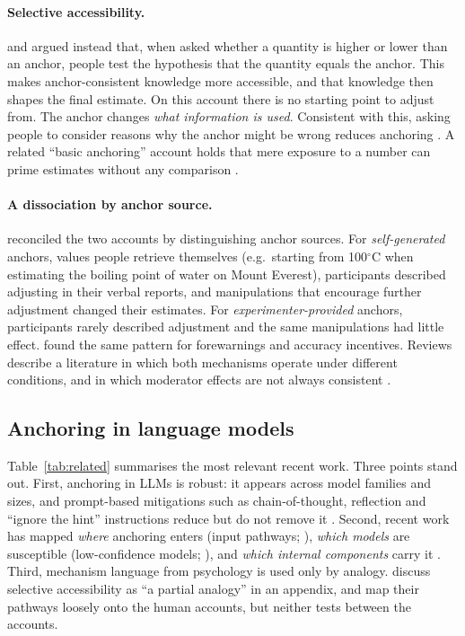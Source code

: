\documentclass[11pt,a4paper]{article}
\begin{document}
\paragraph{Selective accessibility.} \citet{strack1997explaining} and \citet{mussweiler1999hypothesis} argued instead that, when asked whether a quantity is higher or lower than an anchor, people test the hypothesis that the quantity equals the anchor. This makes anchor-consistent knowledge more accessible, and that knowledge then shapes the final estimate. On this account there is no starting point to adjust from. The anchor changes \emph{what information is used}. Consistent with this, asking people to consider reasons why the anchor might be wrong reduces anchoring \citep{mussweiler2000overcoming}. A related ``basic anchoring'' account holds that mere exposure to a number can prime estimates without any comparison \citep{wilson1996new}.

\paragraph{A dissociation by anchor source.} \citet{epley2001putting} reconciled the two accounts by distinguishing anchor sources. For \emph{self-generated} anchors, values people retrieve themselves (e.g.\ starting from 100$^\circ$C when estimating the boiling point of water on Mount Everest), participants described adjusting in their verbal reports, and manipulations that encourage further adjustment changed their estimates. For \emph{experimenter-provided} anchors, participants rarely described adjustment and the same manipulations had little effect. \citet{epley2005effortful} found the same pattern for forewarnings and accuracy incentives. Reviews describe a literature in which both mechanisms operate under different conditions, and in which moderator effects are not always consistent \citep{furnham2011literature}.

\subsection{Anchoring in language models}

Table~\ref{tab:related} summarises the most relevant recent work. Three points stand out. First, anchoring in LLMs is robust: it appears across model families and sizes, and prompt-based mitigations such as chain-of-thought, reflection and ``ignore the hint'' instructions reduce but do not remove it \citep{lou2026anchoring,huang2025understanding}. Second, recent work has mapped \emph{where} anchoring enters (input pathways; \citealp{borjigin2026anchorbench}), \emph{which models} are susceptible (low-confidence models; \citealp{owusu2026anchoring}), and \emph{which internal components} carry it \citep{owusu2026localizing,huang2025understanding,valencia2025anchors}. Third, mechanism language from psychology is used only by analogy. \citet{huang2025understanding} discuss selective accessibility as ``a partial analogy'' in an appendix, and \citet{borjigin2026anchorbench} map their pathways loosely onto the human accounts, but neither tests between the accounts.
\end{document}
